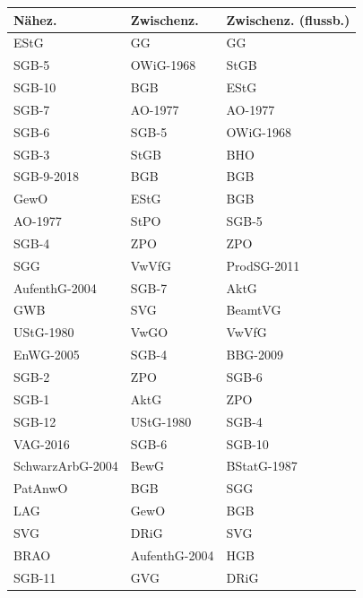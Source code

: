 \begin{tabular}{lll}
\toprule
          Nähez. &    Zwischenz. & Zwischenz. (flussb.) \\
\midrule
            EStG &            GG &                   GG \\
           SGB-5 &     OWiG-1968 &                 StGB \\
          SGB-10 &           BGB &                 EStG \\
           SGB-7 &       AO-1977 &              AO-1977 \\
           SGB-6 &         SGB-5 &            OWiG-1968 \\
           SGB-3 &          StGB &                  BHO \\
      SGB-9-2018 &           BGB &                  BGB \\
            GewO &          EStG &                  BGB \\
         AO-1977 &          StPO &                SGB-5 \\
           SGB-4 &           ZPO &                  ZPO \\
             SGG &         VwVfG &          ProdSG-2011 \\
   AufenthG-2004 &         SGB-7 &                 AktG \\
             GWB &           SVG &              BeamtVG \\
       UStG-1980 &          VwGO &                VwVfG \\
       EnWG-2005 &         SGB-4 &             BBG-2009 \\
           SGB-2 &           ZPO &                SGB-6 \\
           SGB-1 &          AktG &                  ZPO \\
          SGB-12 &     UStG-1980 &                SGB-4 \\
        VAG-2016 &         SGB-6 &               SGB-10 \\
SchwarzArbG-2004 &          BewG &          BStatG-1987 \\
         PatAnwO &           BGB &                  SGG \\
             LAG &          GewO &                  BGB \\
             SVG &          DRiG &                  SVG \\
            BRAO & AufenthG-2004 &                  HGB \\
          SGB-11 &           GVG &                 DRiG \\
\bottomrule
\end{tabular}
